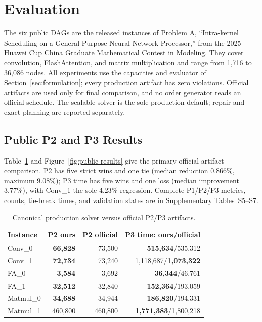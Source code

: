 \section{Evaluation}\label{sec:experiments}

The six public DAGs are the released instances of Problem A, ``Intra-kernel
Scheduling on a General-Purpose Neural Network Processor,'' from the 2025
Huawei Cup China Graduate Mathematical Contest in Modeling. They cover
convolution, FlashAttention, and matrix multiplication and range from 1,716 to
36,086 nodes. All experiments use the capacities and
evaluator of Section~\ref{sec:formulation}; every production artifact has zero
violations. Official artifacts are used only for final comparison, and no order
generator reads an official schedule. The scalable solver is the sole production
default; repair and exact planning are reported separately.

\subsection{Public P2 and P3 Results}\label{sec:exp-p2}

Table~\ref{tab:public} and Figure~\ref{fig:public-results} give the primary
official-artifact comparison. P2 has five strict wins and one tie (median
reduction $0.866\%$, maximum $9.08\%$); P3 time has five wins and one loss
(median improvement $3.77\%$), with Conv\_1 the sole $4.23\%$ regression.
Complete P1/P2/P3 metrics, counts, tie-break times, and validation states are in
Supplementary Tables~S5--S7.

\begin{table}[t]\centering\small
\caption{Canonical production solver versus official P2/P3 artifacts.}
\label{tab:public}
\begin{tabular}{lrrr}\toprule
Instance & P2 ours & P2 official & P3 time: ours/official\\\midrule
Conv\_0 & \textbf{66,828} & 73,500 & \textbf{515,634}/535,312\\
Conv\_1 & \textbf{72,734} & 73,240 & 1,118,687/\textbf{1,073,322}\\
FA\_0 & \textbf{3,584} & 3,692 & \textbf{36,344}/46,761\\
FA\_1 & \textbf{32,512} & 32,840 & \textbf{152,364}/193,059\\
Matmul\_0 & \textbf{34,688} & 34,944 & \textbf{186,820}/194,331\\
Matmul\_1 & 460,800 & 460,800 & \textbf{1,771,383}/1,800,218\\\bottomrule
\end{tabular}\end{table}

